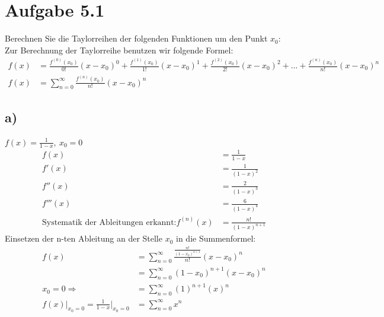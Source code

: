\documentclass{theozettel}
\begin{document}

\section*{Aufgabe 5.1} Berechnen Sie die Taylorreihen der folgenden Funktionen um den Punkt $x_0$:\\
Zur Berechnung der Taylorreihe benutzen wir folgende Formel:
\begin{align*}
f\left(x\right)&=\frac{f^{\left(0\right)}\left(x_0\right)}{0!}\left(x-x_0\right)^0+\frac{f^{\left(1\right)}\left(x_0\right)}{1!}\left(x-x_0\right)^1+\frac{f^{\left(2\right)}\left(x_0\right)}{2!}\left(x-x_0\right)^2+...+\frac{f^{\left(n\right)}\left(x_0\right)}{n!}\left(x-x_0\right)^n\\
f\left(x\right)&=\sum_{n=0}^\infty\frac{f^{\left(n\right)}\left(x_0\right)}{n!}\left(x-x_0\right)^n
\end{align*}
\subsection*{a)}$f\left(x\right)=\frac{1}{1-x}, \ x_0=0$
\begin{align*}
f\left(x\right)&=\frac{1}{1-x}\\
f'\left(x\right)&=\frac{1}{\left(1-x\right)^2}\\
f''\left(x\right)&=\frac{2}{\left(1-x\right)^3}\\
f'''\left(x\right)&=\frac{6}{\left(1-x\right)^4}\\
\text{Systematik der Ableitungen erkannt:}f^{\left(n\right)}\left(x\right)&=\frac{n!}{\left(1-x\right)^{n+1}}
\end{align*}
Einsetzen der n-ten Ableitung an der Stelle $x_0$ in die Summenformel:
\begin{align*}
f\left(x\right)&=\sum_{n=0}^\infty\frac{\frac{n!}{\left(1-x_0\right)^{n+1}}}{n!}\left(x-x_0\right)^n\\
&=\sum_{n=0}^\infty\left(1-x_0\right)^{n+1}\left(x-x_0\right)^n\\
x_0=0\Rightarrow &=\sum_{n=0}^\infty\left(1\right)^{n+1}\left(x\right)^n\\
f\left(x\right)\big|_{x_0=0}=\frac{1}{1-x}\big|_{x_0=0}&=\sum_{n=0}^\infty x^n
\end{align*}
\end{document}
